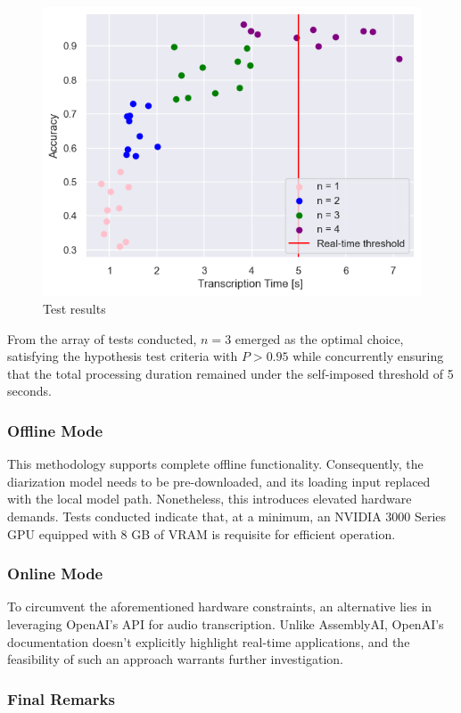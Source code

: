 \documentclass[12pt]{article}
\begin{document}
\begin{figure}[h]
    \centering
    \includegraphics[width=0.8\linewidth]{time-accuracy-plot.png}
    \caption{Test results} 
    \label{fig:test-results} 
\end{figure}

From the array of tests conducted, $n = 3$ emerged as the optimal choice, satisfying the hypothesis test criteria with $P > 0.95$ while concurrently ensuring that the total processing duration remained under the self-imposed threshold of 5 seconds.

\subsubsection{Offline Mode}

This methodology supports complete offline functionality. Consequently, the diarization model needs to be pre-downloaded, and its loading input replaced with the local model path. Nonetheless, this introduces elevated hardware demands. Tests conducted indicate that, at a minimum, an NVIDIA 3000 Series GPU equipped with 8 GB of VRAM is requisite for efficient operation.

\subsubsection{Online Mode}

To circumvent the aforementioned hardware constraints, an alternative lies in leveraging OpenAI's API for audio transcription. Unlike AssemblyAI, OpenAI's documentation doesn't explicitly highlight real-time applications, and the feasibility of such an approach warrants further investigation.

\subsubsection{Final Remarks}
\end{document}
